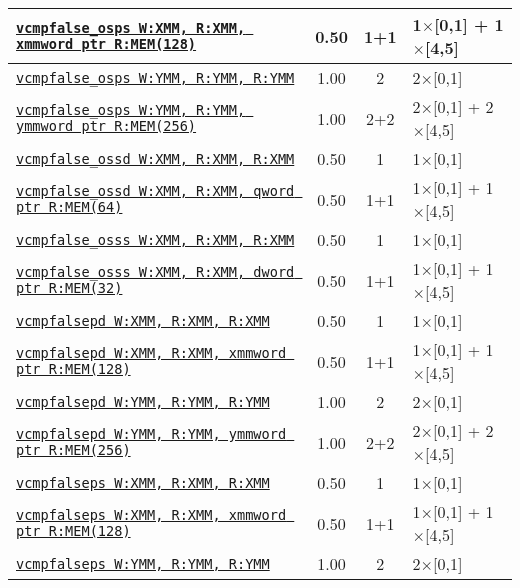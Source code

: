 \documentclass[a4paper,english,fontsize=9]{scrartcl}
\begin{document}
\begin{longtable}{p{}ccL{.25\textwidth}}
  \midrule
  \texttt{\href{https://felixcloutier.com/x86/CMPPS.html}{vcmpfalse\_osps W:XMM, R:XMM, xmmword ptr R:MEM(128)}} & 0.50 & 1+1 & 1\(\times\)[0,1] + 1\(\times\)[4,5] \\
  \midrule
  \texttt{\href{https://felixcloutier.com/x86/CMPPS.html}{vcmpfalse\_osps W:YMM, R:YMM, R:YMM}} & 1.00 & 2 & 2\(\times\)[0,1] \\
  \midrule
  \texttt{\href{https://felixcloutier.com/x86/CMPPS.html}{vcmpfalse\_osps W:YMM, R:YMM, ymmword ptr R:MEM(256)}} & 1.00 & 2+2 & 2\(\times\)[0,1] + 2\(\times\)[4,5] \\
  \midrule
  \texttt{\href{https://felixcloutier.com/x86/CMPSD.html}{vcmpfalse\_ossd W:XMM, R:XMM, R:XMM}} & 0.50 & 1 & 1\(\times\)[0,1] \\
  \midrule
  \texttt{\href{https://felixcloutier.com/x86/CMPSD.html}{vcmpfalse\_ossd W:XMM, R:XMM, qword ptr R:MEM(64)}} & 0.50 & 1+1 & 1\(\times\)[0,1] + 1\(\times\)[4,5] \\
  \midrule
  \texttt{\href{https://felixcloutier.com/x86/CMPSS.html}{vcmpfalse\_osss W:XMM, R:XMM, R:XMM}} & 0.50 & 1 & 1\(\times\)[0,1] \\
  \midrule
  \texttt{\href{https://felixcloutier.com/x86/CMPSS.html}{vcmpfalse\_osss W:XMM, R:XMM, dword ptr R:MEM(32)}} & 0.50 & 1+1 & 1\(\times\)[0,1] + 1\(\times\)[4,5] \\
  \midrule
  \texttt{\href{https://felixcloutier.com/x86/CMPPD.html}{vcmpfalsepd W:XMM, R:XMM, R:XMM}} & 0.50 & 1 & 1\(\times\)[0,1] \\
  \midrule
  \texttt{\href{https://felixcloutier.com/x86/CMPPD.html}{vcmpfalsepd W:XMM, R:XMM, xmmword ptr R:MEM(128)}} & 0.50 & 1+1 & 1\(\times\)[0,1] + 1\(\times\)[4,5] \\
  \midrule
  \texttt{\href{https://felixcloutier.com/x86/CMPPD.html}{vcmpfalsepd W:YMM, R:YMM, R:YMM}} & 1.00 & 2 & 2\(\times\)[0,1] \\
  \midrule
  \texttt{\href{https://felixcloutier.com/x86/CMPPD.html}{vcmpfalsepd W:YMM, R:YMM, ymmword ptr R:MEM(256)}} & 1.00 & 2+2 & 2\(\times\)[0,1] + 2\(\times\)[4,5] \\
  \midrule
  \texttt{\href{https://felixcloutier.com/x86/CMPPS.html}{vcmpfalseps W:XMM, R:XMM, R:XMM}} & 0.50 & 1 & 1\(\times\)[0,1] \\
  \midrule
  \texttt{\href{https://felixcloutier.com/x86/CMPPS.html}{vcmpfalseps W:XMM, R:XMM, xmmword ptr R:MEM(128)}} & 0.50 & 1+1 & 1\(\times\)[0,1] + 1\(\times\)[4,5] \\
  \midrule
  \texttt{\href{https://felixcloutier.com/x86/CMPPS.html}{vcmpfalseps W:YMM, R:YMM, R:YMM}} & 1.00 & 2 & 2\(\times\)[0,1] \\

\end{longtable}
\end{document}
